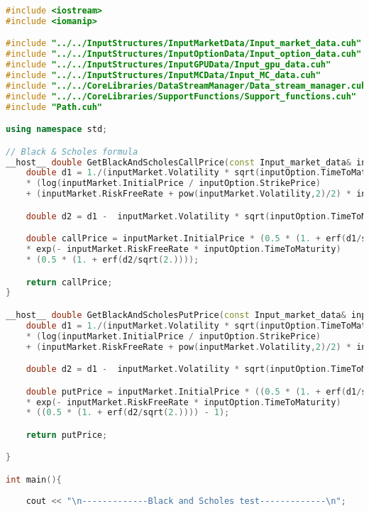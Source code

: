 \begin{lstlisting}[language=C++, caption={\texttt{libraries/CoreLibraries/Path/BlackScholesUnitTest.cu}}]
#include <iostream>
#include <iomanip>

#include "../../InputStructures/InputMarketData/Input_market_data.cuh"
#include "../../InputStructures/InputOptionData/Input_option_data.cuh"
#include "../../InputStructures/InputGPUData/Input_gpu_data.cuh"
#include "../../InputStructures/InputMCData/Input_MC_data.cuh"
#include "../../CoreLibraries/DataStreamManager/Data_stream_manager.cuh"
#include "../../CoreLibraries/SupportFunctions/Support_functions.cuh"
#include "Path.cuh"

using namespace std;

// Black & Scholes formula
__host__ double GetBlackAndScholesCallPrice(const Input_market_data& inputMarket, const Input_option_data& inputOption){
	double d1 = 1./(inputMarket.Volatility * sqrt(inputOption.TimeToMaturity)) 
	* (log(inputMarket.InitialPrice / inputOption.StrikePrice)
	+ (inputMarket.RiskFreeRate + pow(inputMarket.Volatility,2)/2) * inputOption.TimeToMaturity);

	double d2 = d1 -  inputMarket.Volatility * sqrt(inputOption.TimeToMaturity);

	double callPrice = inputMarket.InitialPrice * (0.5 * (1. + erf(d1/sqrt(2.)))) - inputOption.StrikePrice 
	* exp(- inputMarket.RiskFreeRate * inputOption.TimeToMaturity)
	* (0.5 * (1. + erf(d2/sqrt(2.))));

	return callPrice;	 
}

__host__ double GetBlackAndScholesPutPrice(const Input_market_data& inputMarket, const Input_option_data& inputOption){
	double d1 = 1./(inputMarket.Volatility * sqrt(inputOption.TimeToMaturity)) 
	* (log(inputMarket.InitialPrice / inputOption.StrikePrice)
	+ (inputMarket.RiskFreeRate + pow(inputMarket.Volatility,2)/2) * inputOption.TimeToMaturity);

	double d2 = d1 -  inputMarket.Volatility * sqrt(inputOption.TimeToMaturity);

	double putPrice = inputMarket.InitialPrice * ((0.5 * (1. + erf(d1/sqrt(2.)))) - 1) - inputOption.StrikePrice
	* exp(- inputMarket.RiskFreeRate * inputOption.TimeToMaturity)
	* ((0.5 * (1. + erf(d2/sqrt(2.)))) - 1);

	return putPrice;

}

int main(){
    
    cout << "\n-------------Black and Scholes test-------------\n";


\end{lstlisting}

